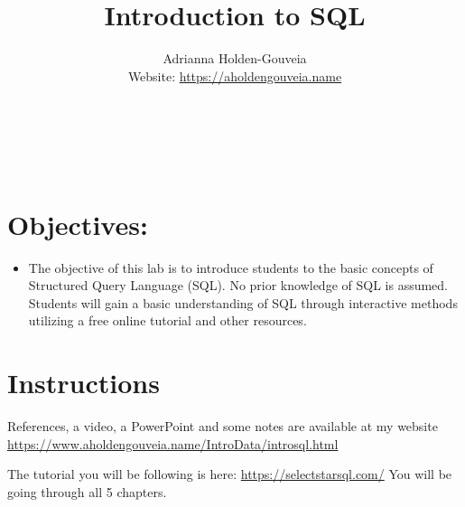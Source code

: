 \documentclass[12pt]{article}
\title{Introduction to SQL}
\author{
        Adrianna Holden-Gouveia \\
        Website: \url{https://aholdengouveia.name}\\ 
        \date{\vspace{-5ex}}
        \faLinkedin{: aholdengouveia} \\
        \faGithub {: aholdengouveia} \\
        \faTwitter {: aholdengouveia} \\
        }
\begin{document}
    

\maketitle


\section*{Objectives:}
\begin{itemize}
    \item The objective of this lab is to introduce students to the basic concepts of Structured Query Language (SQL). No prior knowledge of SQL is assumed. Students will gain a basic understanding of SQL through interactive methods utilizing a free online tutorial and other resources.
\end{itemize}
\section*{Instructions}

References, a video, a PowerPoint and some notes are available at my website
\url {https://www.aholdengouveia.name/IntroData/introsql.html}

The tutorial you will be following is here: \url{https://selectstarsql.com/} You will be going through all 5 chapters.
\end{document}
